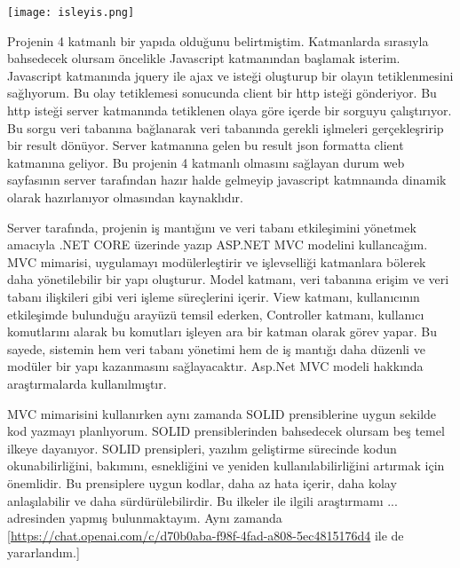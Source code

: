 		\texttt{[image: isleyis.png]}



Projenin 4 katmanlı bir yapıda olduğunu belirtmiştim. Katmanlarda sırasıyla bahsedecek
olursam öncelikle Javascript katmanından başlamak isterim. Javascript katmanında jquery ile
ajax ve isteği oluşturup bir olayın tetiklenmesini sağlıyorum. Bu olay tetiklemesi
sonucunda client bir http isteği gönderiyor. Bu http isteği server katmanında tetiklenen olaya göre
içerde bir sorguyu çalıştırıyor. Bu sorgu veri tabanına bağlanarak veri tabanında gerekli işlmeleri 
gerçekleşririp bir result dönüyor. Server katmanına gelen bu result json formatta client katmanına geliyor.
Bu projenin 4 katmanlı olmasını sağlayan durum web sayfasının server tarafından hazır halde gelmeyip javascript 
katmnaında dinamik olarak hazırlanıyor olmasından kaynaklıdır.


Server tarafında, projenin iş mantığını ve veri tabanı etkileşimini yönetmek amacıyla .NET CORE üzerinde yazıp ASP.NET MVC modelini kullancağım. MVC mimarisi, uygulamayı modülerleştirir ve işlevselliği katmanlara bölerek daha yönetilebilir bir yapı oluşturur. Model katmanı, veri tabanına erişim ve veri tabanı ilişkileri gibi veri işleme süreçlerini içerir. View katmanı, kullanıcının etkileşimde bulunduğu arayüzü temsil ederken, Controller katmanı, kullanıcı komutlarını alarak bu komutları işleyen ara bir katman olarak görev yapar. Bu sayede, sistemin hem veri tabanı yönetimi hem de iş mantığı daha düzenli ve modüler bir yapı kazanmasını sağlayacaktır.
Asp.Net MVC modeli hakkında araştırmalarda kullanılmıştır.\cite{sozerihayatimda}
\vspace{1\baselineskip} %


MVC mimarisini kullanırken aynı zamanda SOLID prensiblerine uygun sekilde
kod yazmayı planlıyorum. SOLID prensiblerinden bahsedecek olursam beş temel ilkeye 
dayanıyor. SOLID prensipleri, yazılım geliştirme sürecinde kodun okunabilirliğini, bakımını,
esnekliğini ve yeniden kullanılabilirliğini artırmak için önemlidir. Bu prensiplere uygun kodlar,
daha az hata içerir, daha kolay anlaşılabilir ve daha sürdürülebilirdir. \newline 
Bu ilkeler ile ilgili araştırmamı ... adresinden yapmış bulunmaktayım.\cite{turan2018solid}\newline 
Aynı zamanda [\url{https://chat.openai.com/c/d70b0aba-f98f-4fad-a808-5ec4815176d4} ile de yararlandım.]
\vspace{1\baselineskip} %



